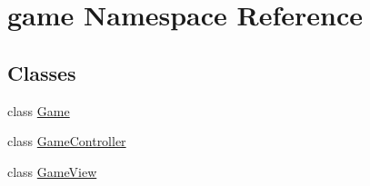 \hypertarget{namespacegame}{\section{game \-Namespace \-Reference}
\label{d3/d2c/namespacegame}
}
\subsection*{\-Classes}
\begin{DoxyCompactItemize}
\item 
class \hyperlink{classgame_1_1Game}{\-Game}
\item 
class \hyperlink{classgame_1_1GameController}{\-Game\-Controller}
\item 
class \hyperlink{classgame_1_1GameView}{\-Game\-View}
\end{DoxyCompactItemize}
